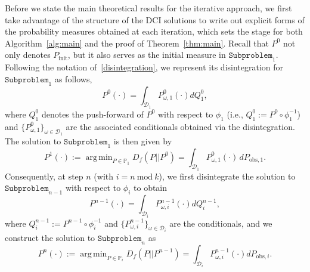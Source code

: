 \documentclass{article}
\newcounter{example}[section]
\newcommand{\p}{\mathbb{P}}
\newcommand{\initmeas}{P_{\text{init}}}
\DeclareMathOperator*{\argmin}{arg\,min}
\begin{document}
Before we state the main theoretical results for the iterative approach, we first take advantage of the structure of the DCI solutions to write out explicit forms of the probability measures obtained at each iteration, which sets the stage for both Algorithm~\ref{alg:main} and the proof of Theorem~\ref{thm:main}. 
Recall that $P^0$ not only denotes $\initmeas$, but it also serves as the initial measure in $\mathtt{Subproblem}_1$.
Following the notation of~\eqref{disintegration}, we represent its disintegration for $\mathtt{Subproblem}_1$ as follows,  
\begin{equation*}
    P^{0}(\cdot) = \int_{\mathcal{D}_{1}} P^{0}_{\omega,{1}}(\cdot) dQ^{0}_{1},
\end{equation*}
where $Q^{0}_{1}$ denotes the push-forward of $P^0$ with respect to $\phi_1$ (i.e., $Q^0_1:= P^{0}\circ\phi^{-1}_{1}$) and $\{P^0_{\omega,1}\}_{\omega \in\mathcal{D}_1}$ are the associated conditionals obtained via the disintegration.
The solution to $\mathtt{Subproblem}_1$ is then given by
\begin{equation*}
    P^{1}(\cdot) := \argmin_{P \in \p_{1}}D_f(P||P^{0}) = \int_{\mathcal{D}_{1}} P^{0}_{\omega,{1}}(\cdot) \, dP_{\text{obs}, 1}.
\end{equation*}
Consequently, at step $n$ (with $i=n\mathrm{~mod~}k$), we first disintegrate the solution to $\mathtt{Subproblem}_{n-1}$ with respect to $\phi_i$ to obtain
\begin{equation*}
    P^{n-1}(\cdot) = \int_{\mathcal{D}_{i}} P^{n-1}_{\omega,i}(\cdot) dQ^{n-1}_{i},
\end{equation*}
where $Q^{n-1}_{i} := P^{n-1}\circ\phi^{-1}_{i}$ and $\{P^{n-1}_{\omega,i}\}_{\omega\in\mathcal{D}_i}$ are the conditionals, and we construct the solution to $\mathtt{Subproblem}_n$ as
\begin{equation*}
    P^{n}(\cdot) := \argmin_{P \in \p_{i}}D_f(P || P^{n-1}) = \int_{\mathcal{D}_{i}} P^{n-1}_{\omega,i}(\cdot) dP_{\text{obs},i}.
\end{equation*}
\end{document}
